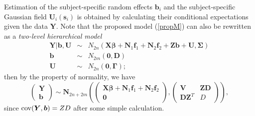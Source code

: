 \documentclass[article,lineno]{biometrika}
\begin{document}
Estimation of the subject-specific random effects $\boldsymbol b_i$ and the subject-specific Gaussian field $\boldsymbol U_i(\boldsymbol s_i)$ is obtained by calculating their conditional expectations given the data $\boldsymbol Y$.
Note that the proposed model (\ref{propM}) can also be rewritten as a {\it two-level hierarchical model}
\begin{eqnarray*}
\boldsymbol Y| \boldsymbol b, \boldsymbol U 
&\sim&
N_{2n} \left(\boldsymbol{X}\boldsymbol{\beta} +
 \boldsymbol N_{1} \boldsymbol f_1 + 
  \boldsymbol N_{2} \boldsymbol f_2 + 
\boldsymbol{Z}\boldsymbol{b} + \boldsymbol U,  
\boldsymbol \Sigma \right)
\\ 
\boldsymbol b &\sim& N_{2m} (\boldsymbol 0, \boldsymbol D)   
\\
\boldsymbol U &\sim& N_{2n} (\boldsymbol 0, \boldsymbol \Gamma); \nonumber
\end{eqnarray*}
then by the property of normality, we have 
 \[
 \begin{pmatrix}
  \boldsymbol Y \\
  \boldsymbol b
 \end{pmatrix}
 \sim 
 \boldsymbol N_{2n + 2m} 
 \left(
 \begin{pmatrix}
 \boldsymbol{X}\boldsymbol{\beta} + \boldsymbol N_{1} \boldsymbol f_1 +  \boldsymbol N_{2} \boldsymbol f_2 \\
\boldsymbol 0
 \end{pmatrix},
  \begin{pmatrix}
  \boldsymbol V &  \boldsymbol Z\boldsymbol D \\
  \boldsymbol D\boldsymbol Z^T & D 
 \end{pmatrix}
 \right),
\]
since ${\rm cov} (\bm Y, \bm b) = ZD$ after some simple calculation.
\end{document}
